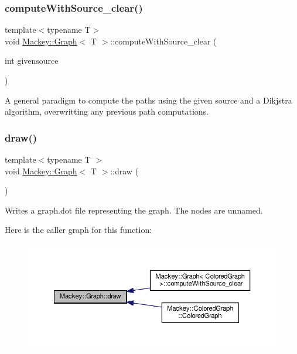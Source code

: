 \subsubsection{\texorpdfstring{compute\+With\+Source\+\_\+clear()}{computeWithSource\_clear()}}
{\footnotesize\ttfamily template$<$typename T$>$ \\
void \hyperlink{classMackey_1_1Graph}{Mackey\+::\+Graph}$<$ T $>$\+::compute\+With\+Source\+\_\+clear (\begin{DoxyParamCaption}\item[{int}]{givensource }\end{DoxyParamCaption})\hspace{0.3cm}{\ttfamily [inline]}}



A general paradigm to compute the paths using the given source and a Dikjstra algorithm, overwritting any previous path computations. 

\mbox{\label{classMackey_1_1Graph_ab88d38f2fa1822d415ce7dac272b32dc}} 
\subsubsection{\texorpdfstring{draw()}{draw()}\hspace{0.1cm}{\footnotesize\ttfamily [1/2]}}
{\footnotesize\ttfamily template$<$typename T $>$ \\
void \hyperlink{classMackey_1_1Graph}{Mackey\+::\+Graph}$<$ T $>$\+::draw (\begin{DoxyParamCaption}{ }\end{DoxyParamCaption})}



Writes a graph.\+dot file representing the graph. The nodes are unnamed. 

Here is the caller graph for this function\+:\nopagebreak
\begin{figure}[H]
\begin{center}
\leavevmode
\includegraphics[width=350pt]{classMackey_1_1Graph_ab88d38f2fa1822d415ce7dac272b32dc_icgraph}
\end{center}
\end{figure}
\mbox{\label{classMackey_1_1Graph_a63aa485ca7838f3dc66da1749e09cd84}} 
